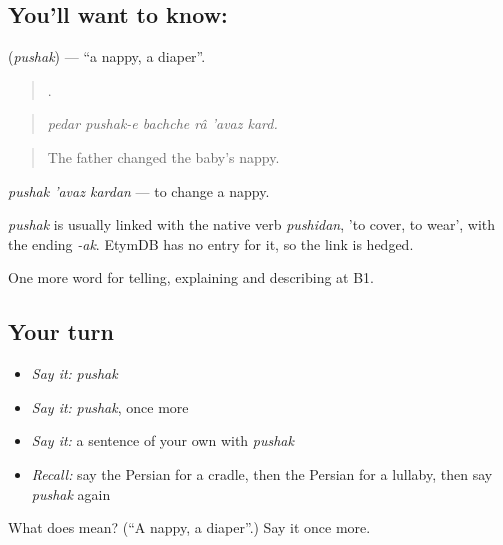 \subsection*{You'll want to know: }
\textbf{} (\emph{pushak}) — \textquotedblleft{}a nappy, a diaper\textquotedblright{}.

\begin{quote}
     .
\end{quote}

\begin{quote}
\emph{pedar pushak-e bachche râ 'avaz kard.}
\end{quote}

\begin{quote}
The father changed the baby's nappy.
\end{quote}

\emph{pushak 'avaz kardan} — to change a nappy.

\begin{cousinweb}
\emph{pushak} is usually linked with the native verb \emph{pushidan}, 'to cover, to wear', with the ending \emph{-ak}. EtymDB has no entry for it, so the link is hedged.
\end{cousinweb}

\begin{grammarlens}[title={What you've built}]
One more word for telling, explaining and describing at B1.
\end{grammarlens}

\subsection*{Your turn}
\begin{itemize}
\raggedright
  \item \emph{Say it:} \emph{pushak}
  \item \emph{Say it:} \emph{pushak}, once more
  \item \emph{Say it:} a sentence of your own with \emph{pushak}
  \item \emph{Recall:} say the Persian for a cradle, then the Persian for a lullaby, then say \emph{pushak} again
\end{itemize}

\begin{tcolorbox}[breakable,colback=teal!4,colframe=teal!35!black,title={Before you move on}]
What does  mean? (\textquotedblleft{}A nappy, a diaper\textquotedblright{}.) Say it once more.
\end{tcolorbox}
